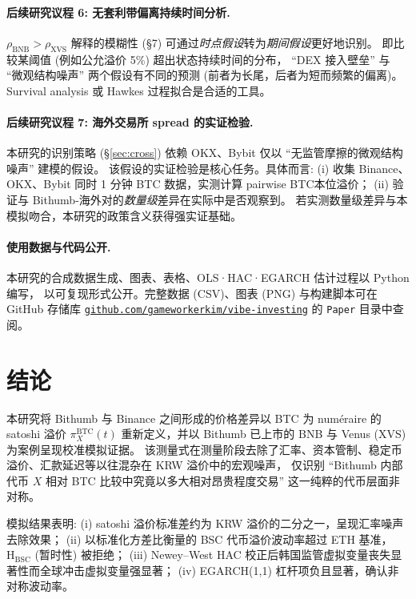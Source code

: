 \documentclass[11pt,a4paper]{article}
\begin{document}
\paragraph{后续研究议程 6: 无套利带偏离持续时间分析.}
$\rho_{\text{BNB}}>\rho_{\text{XVS}}$ 解释的模糊性 (\S 7) 可通过\emph{时点假设}转为\emph{期间假设}更好地识别。
即比较某阈值 (例如公允溢价 5\%) 超出状态持续时间的分布，
``DEX 接入壁垒'' 与 ``微观结构噪声'' 两个假设有不同的预测 (前者为长尾，后者为短而频繁的偏离)。
Survival analysis 或 Hawkes 过程拟合是合适的工具。

\paragraph{后续研究议程 7: 海外交易所 spread 的实证检验.}
本研究的识别策略 (\S\ref{sec:cross}) 依赖 OKX、Bybit 仅以 ``无监管摩擦的微观结构噪声'' 建模的假设。
该假设的实证检验是核心任务。具体而言:
(i) 收集 Binance、OKX、Bybit 同时 1 分钟 BTC 数据，实测计算 pairwise BTC本位溢价；
(ii) 验证与 Bithumb-海外对的\emph{数量级}差异在实际中是否观察到。
若实测数量级差异与本模拟吻合，本研究的政策含义获得强实证基础。

\paragraph{使用数据与代码公开.}
本研究的合成数据生成、图表、表格、OLS·HAC·EGARCH 估计过程以 Python 编写，
以可复现形式公开。完整数据 (CSV)、图表 (PNG) 与构建脚本可在 GitHub 存储库
\href{https://github.com/gameworkerkim/vibe-investing}{\texttt{github.com/gameworkerkim/vibe-investing}}
的 \texttt{Paper} 目录中查阅。

\section{结论}

本研究将 Bithumb 与 Binance 之间形成的价格差异以 BTC 为 num\'eraire 的 satoshi 溢价
$\pi^{\text{BTC}}_X(t)$ 重新定义，并以 Bithumb 已上市的 BNB 与 Venus (XVS) 为案例呈现校准模拟证据。
该测量式在测量阶段去除了汇率、资本管制、稳定币溢价、汇款延迟等以往混杂在 KRW 溢价中的宏观噪声，
仅识别 ``Bithumb 内部代币 $X$ 相对 BTC 比较中究竟以多大相对昂贵程度交易'' 这一纯粹的代币层面非对称。

模拟结果表明: (i) satoshi 溢价标准差约为 KRW 溢价的二分之一，呈现汇率噪声去除效果；
(ii) 以标准化方差比衡量的 BSC 代币溢价波动率超过 ETH 基准，$\mathrm{H_{BSC}}$ (暂时性) 被拒绝；
(iii) Newey--West HAC 校正后韩国监管虚拟变量丧失显著性而全球冲击虚拟变量强显著；
(iv) EGARCH(1,1) 杠杆项负且显著，确认非对称波动率。
\end{document}
